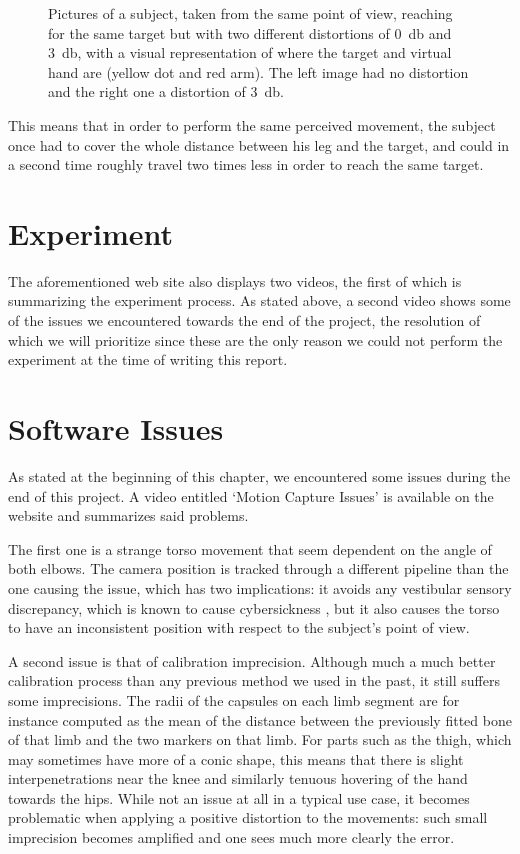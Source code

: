 \begin{figure}[h]
    \caption{Pictures of a subject, taken from the same point of view, reaching for the same target but with two different distortions of \SI{0}{\decibel} and \SI{3}{\decibel}, with a visual representation of where the target and virtual hand are (yellow dot and red arm). The left image had no distortion and the right one a distortion of \SI{3}{\decibel}.}
    \label{fig:realMocapDistortion}
\end{figure}

This means that in order to perform the same perceived movement, the subject once had to cover the whole distance between his leg and the target, and could in a second time roughly travel two times less in order to reach the same target.

\section{Experiment}

The aforementioned web site also displays two videos, the first of which is summarizing the experiment process. As stated above, a second video shows some of the issues we encountered towards the end of the project, the resolution of which we will prioritize since these are the only reason we could not perform the experiment at the time of writing this report.

\section{Software Issues}
\label{sec:issues}
As stated at the beginning of this chapter, we encountered some issues during the end of this project. A video entitled `Motion Capture Issues' is available on the website and summarizes said problems.

The first one is a strange torso movement that seem dependent on the angle of both elbows. The camera position is tracked through a different pipeline than the one causing the issue, which has two implications: it avoids any vestibular sensory discrepancy, which is known to cause cybersickness \cite{laviola2000discussion}, but it also causes the torso to have an inconsistent position with respect to the subject's point of view.

A second issue is that of calibration imprecision. Although much a much better calibration process than any previous method we used in the past, it still suffers some imprecisions. The radii of the capsules on each limb segment are for instance computed as the mean of the distance between the previously fitted bone of that limb and the two markers on that limb. For parts such as the thigh, which may sometimes have more of a conic shape, this means that there is slight interpenetrations near the knee and similarly tenuous hovering of the hand towards the hips. While not an issue at all in a typical use case, it becomes problematic when applying a positive distortion to the movements: such small imprecision becomes amplified and one sees much more clearly the error.

